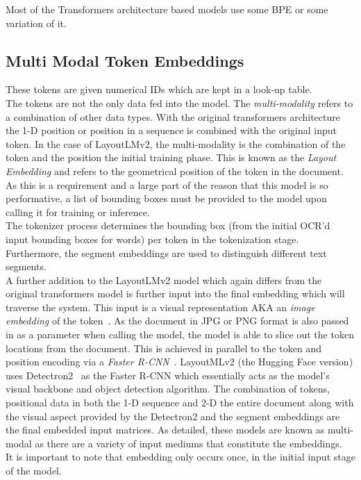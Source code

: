 Most of the Transformers architecture based models use some BPE or some variation of it.
\subsection{Multi Modal Token Embeddings}
These tokens are given numerical IDs which are kept in a look-up table.\\
The tokens are not the only data fed into the model. The \emph{multi-modality} refers to a combination of other data types. With the original
transformers architecture the 1-D position or position in a sequence is combined with the original input token. In the case of
LayoutLMv2, the multi-modality is the combination of the token and the position the initial training phase.
This is known as the \emph{Layout Embedding} and refers to the geometrical position of the token in the document.
As this is a requirement and a large part of the reason that this model is so performative, a list of bounding boxes must be provided to the model
upon calling it for training or inference. \\
The tokenizer process determines the bounding box (from the initial OCR'd input bounding boxes for words) per token in the tokenization stage.
\bigbreak
Furthermore, the segment embeddings are used to distinguish different text segments.\\
A further addition to the LayoutLMv2 model which again differs from the original transformers model is further input into the final embedding which
will traverse the system. This input is a visual representation AKA an \emph{image embedding} of the token~\autocite{LayoutLMExplained2022}.
As the document in JPG or PNG format is also passed in as a parameter when calling the model, the model is able to slice out the token locations
from the document. This is achieved in parallel to the token and position encoding via a \emph{Faster R-CNN}~\autocite{FasterRCNNExplained2020}.
LayoutMLv2 (the Hugging Face version) uses Detectron2~\autocite{FacebookresearchDetectron22022} as the Faster R-CNN which essentially acts as the model's visual backbone and
object detection algorithm.
\bigbreak
The combination of tokens, positional data in both the 1-D sequence and 2-D the entire document along with the visual aspect provided by the
Detectron2 and the segment embeddings are the final embedded input matrices. As detailed, these models are known as multi-modal as there are a variety of input mediums that constitute the
embeddings.\\
It is important to note that embedding only occurs once, in the initial input stage of the model.
